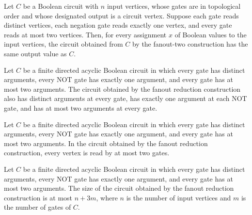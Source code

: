 \begin{theorem}
\label{BoolCircuit.DAGCircuit.fanoutTwo_eval}
\leanok
{}
Let $C$ be a Boolean circuit with $n$ input vertices, whose gates are in topological
order and whose designated output is a circuit vertex. Suppose each gate reads distinct
vertices, each negation gate reads exactly one vertex, and every gate reads at most two
vertices. Then, for every assignment $x$ of Boolean values to the input vertices, the
circuit obtained from $C$ by the fanout-two construction has the same output value as
$C$.
\end{theorem}

\begin{theorem}
\label{BoolCircuit.DAGCircuit.fanoutTwo_isFaninTwo}
\leanok
{}
Let $C$ be a finite directed acyclic Boolean circuit in which every gate has distinct
arguments, every NOT gate has exactly one argument, and every gate has at most two
arguments. The circuit obtained by the fanout reduction construction also has distinct
arguments at every gate, has exactly one argument at each NOT gate, and has at most two
arguments at every gate.
\end{theorem}

\begin{theorem}
\label{BoolCircuit.DAGCircuit.fanoutTwo_hasFanoutTwo}
\leanok
{}
Let $C$ be a finite directed acyclic Boolean circuit in which every gate has distinct
arguments, every NOT gate has exactly one argument, and every gate has at most two
arguments. In the circuit obtained by the fanout reduction construction, every vertex is
read by at most two gates.
\end{theorem}

\begin{theorem}
\label{BoolCircuit.DAGCircuit.fanoutTwo_size_le}
\leanok
{}
Let $C$ be a finite directed acyclic Boolean circuit in which every gate has distinct
arguments, every NOT gate has exactly one argument, and every gate has at most two
arguments. The size of the circuit obtained by the fanout reduction construction is at
most $n+3m$, where $n$ is the number of input vertices and $m$ is the number of gates of
$C$.
\end{theorem}

